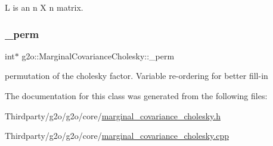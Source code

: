 L is an n X n matrix. 

\mbox{\label{classg2o_1_1_marginal_covariance_cholesky_a404f5d0ce82c2877324bafb8997b96aa}} 
\subsubsection{\texorpdfstring{\+\_\+perm}{\_perm}}
{\footnotesize\ttfamily int$\ast$ g2o\+::\+Marginal\+Covariance\+Cholesky\+::\+\_\+perm\hspace{0.3cm}{\ttfamily [protected]}}



permutation of the cholesky factor. Variable re-\/ordering for better fill-\/in 



The documentation for this class was generated from the following files\+:\begin{DoxyCompactItemize}
\item 
Thirdparty/g2o/g2o/core/\mbox{\hyperlink{marginal__covariance__cholesky_8h}{marginal\+\_\+covariance\+\_\+cholesky.\+h}}\item 
Thirdparty/g2o/g2o/core/\mbox{\hyperlink{marginal__covariance__cholesky_8cpp}{marginal\+\_\+covariance\+\_\+cholesky.\+cpp}}\end{DoxyCompactItemize}
